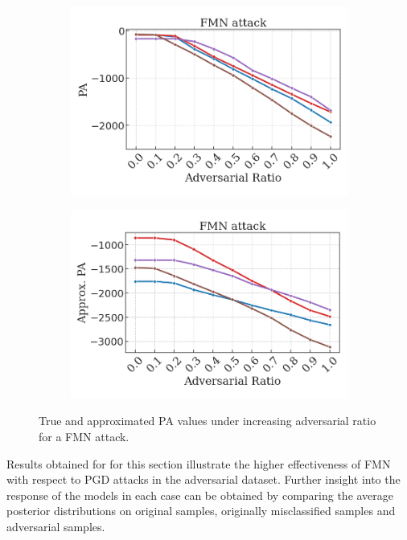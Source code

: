 \begin{figure}[H]
    \centering
    \begin{subfigure}[b]{0.45\textwidth}
        \centering
        \includegraphics[width=\textwidth]{img/results_discussion/adversarial/fmn_pa_approx.png}
    \end{subfigure}
    \begin{subfigure}[b]{0.45\textwidth}
        \centering
        \includegraphics[width=\textwidth]{img/results_discussion/adversarial/fmn_pa_approx_approx.png}
    \end{subfigure}

    \caption{True and approximated PA values under increasing adversarial ratio for
    a FMN attack.}
    \label{fig:appendix_adversarial_approx_pa_fmn}
\end{figure}

Results obtained for for this section illustrate the higher effectiveness of FMN with respect
to PGD attacks in the adversarial dataset. Further insight into the response of the models in each case
can be obtained by comparing the average posterior distributions on original samples, originally
misclassified samples and adversarial samples.

